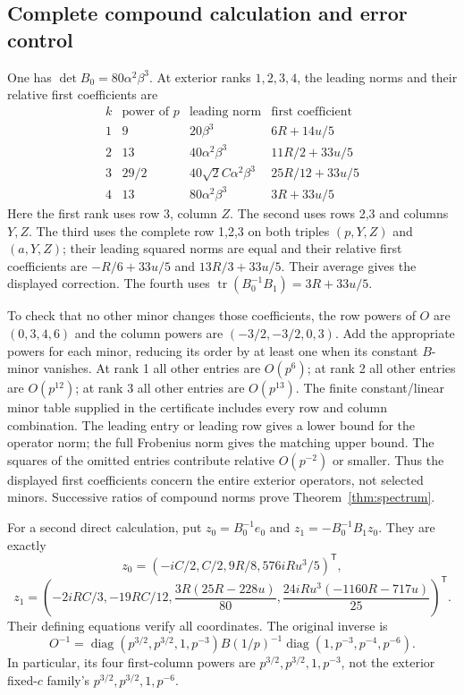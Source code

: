 \subsection{Complete compound calculation and error control}
One has $\det B_0=80\alpha^2\beta^3$. At exterior ranks $1,2,3,4$, the
leading norms and their relative first coefficients are
\[
\begin{array}{c|c|c|c}
 k&\text{power of }p&\text{leading norm}&\text{first coefficient}\\\hline
1&9&20\beta^3&6R+14u/5\\
2&13&40\alpha^2\beta^3&11R/2+33u/5\\
3&29/2&40\sqrt2 C\alpha^2\beta^3&25R/12+33u/5\\
4&13&80\alpha^2\beta^3&3R+33u/5
\end{array}
\]
Here the first rank uses row 3, column $Z$. The second uses rows 2,3 and
columns $Y,Z$. The third uses the complete row 1,2,3 on both triples
$(p,Y,Z)$ and $(a,Y,Z)$; their leading squared norms are equal and their
relative first coefficients are $-R/6+33u/5$ and $13R/3+33u/5$.
Their average gives the displayed correction. The fourth uses
$\operatorname{tr}(B_0^{-1}B_1)=3R+33u/5$.

To check that no other minor changes those coefficients, the row powers of
$O$ are $(0,3,4,6)$ and the column powers are $(-3/2,-3/2,0,3)$.
Add the appropriate powers for each minor, reducing its order by at least
one when its constant $B$-minor vanishes. At rank 1 all other entries are
$O(p^6)$; at rank 2 all other entries are $O(p^{12})$; at rank 3 all other
entries are $O(p^{13})$. The finite constant/linear minor table supplied
in the certificate includes every row and column combination.
The leading entry or leading row gives a lower bound for the operator norm;
the full Frobenius norm gives the matching upper bound. The squares of the
omitted entries contribute relative $O(p^{-2})$ or smaller. Thus the displayed
first coefficients concern the entire exterior operators, not selected minors.
Successive ratios of compound norms prove Theorem~\ref{thm:spectrum}.

For a second direct calculation, put $z_0=B_0^{-1}e_0$ and
$z_1=-B_0^{-1}B_1z_0$. They are exactly
\[
 z_0=(-iC/2,C/2,9R/8,576iRu^3/5)^{\mathsf T},
\]
\[
 z_1=\left(-2iRC/3,-19RC/12,
 \frac{3R(25R-228u)}{80},
 \frac{24iRu^3(-1160R-717u)}{25}\right)^{\mathsf T}.
\]
Their defining equations verify all coordinates. The original inverse is
\begin{equation}\label{eq:invscale}
 O^{-1}=\operatorname{diag}(p^{3/2},p^{3/2},1,p^{-3})
 B(1/p)^{-1}\operatorname{diag}(1,p^{-3},p^{-4},p^{-6}).
\end{equation}
In particular, its four first-column powers are $p^{3/2},p^{3/2},1,p^{-3}$,
not the exterior fixed-$c$ family's $p^{3/2},p^{3/2},1,p^{-6}$.

